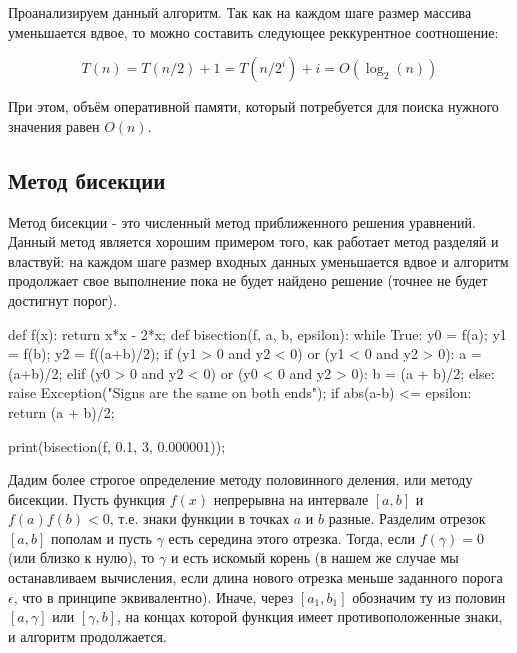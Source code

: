 Проанализируем данный алгоритм. Так как на каждом шаге 
размер массива уменьшается вдвое, то можно составить следующее 
реккурентное соотношение:

$$T(n) = T(n/2) + 1 = T(n/2^i) + i = O(\log_2(n))$$

При этом, объём оперативной памяти, который потребуется 
для поиска нужного значения равен $O(n)$. 

\subsection{Метод бисекции}

Метод бисекции - это численный метод приближенного решения уравнений.
Данный метод является хорошим примером того, как работает метод разделяй и властвуй:
на каждом шаге размер входных данных уменьшается вдвое и алгоритм продолжает 
свое выполнение пока не будет найдено решение (точнее не будет достигнут 
порог). 

\begin{python}
def f(x):
	return x*x - 2*x;
def bisection(f, a, b, epsilon):
	while True:
		y0 = f(a);
		y1 = f(b);
		y2 = f((a+b)/2);
		if (y1 > 0 and y2 < 0) or (y1 < 0 and y2 > 0):
			a = (a+b)/2;
		elif (y0 > 0 and y2 < 0) or (y0 < 0 and y2 > 0):
			b = (a + b)/2;
		else:
			raise Exception("Signs are the same on both ends");
		if abs(a-b) <= epsilon:
			return (a + b)/2;

print(bisection(f, 0.1, 3, 0.000001));
\end{python}

Дадим более строгое определение методу половинного 
деления, или методу бисекции. Пусть функция $f(x)$ непрерывна
на интервале $[a, b]$ и $f(a)f(b)<0$, т.е. знаки функции
в точках $a$ и $b$ разные. Разделим отрезок $[a, b]$ пополам
и пусть $\gamma$ есть середина этого отрезка. Тогда, если
$f(\gamma) = 0$ (или близко к нулю), то $\gamma$ и есть
искомый корень (в нашем же случае мы останавливаем вычисления,
если длина нового отрезка меньше заданного порога $\epsilon$, что в принципе
эквивалентно). Иначе, через $[a_1, b_1]$ обозначим ту из половин
$[a, \gamma]$ или $[\gamma, b]$, на концах которой функция имеет
противоположенные знаки, и алгоритм продолжается.


